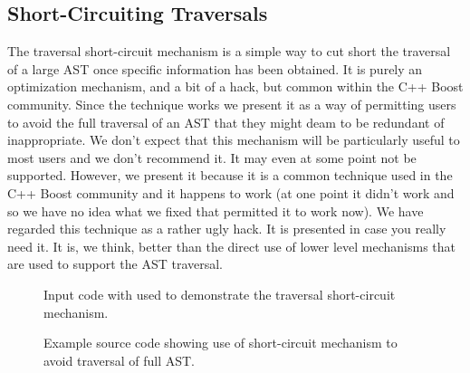 \clearpage
\subsection{Short-Circuiting Traversals}

   The traversal short-circuit mechanism is a simple way to cut short
the traversal of a large AST once specific information has been obtained.
It is purely an optimization mechanism, and a bit of a hack, but common
within the C++ Boost community.  Since the technique works we present it
as a way of permitting users to avoid the full traversal of an AST
that they might deam to be redundant of inappropriate.  We don't
expect that this mechanism will be particularly useful to most users
and we don't recommend it.  It may even at some point not be supported.
However, we present it because it is a common technique used in the C++ 
Boost community and it happens to work (at one point it didn't work and
so we have no idea what we fixed that permitted it to work now).  We have
regarded this technique as a rather ugly hack.  It is presented in case
you really need it.  It is, we think, better than the direct use of lower
level mechanisms that are used to support the AST traversal.

\begin{figure}[!h]
{\indent
{\mySmallFontSize

\begin{latexonly}
   
\end{latexonly}

\begin{htmlonly}
   
\end{htmlonly}
}
}
\caption{Input code with used to demonstrate the traversal short-circuit mechanism.}
\label{Tutorial:exampleInputCode_ExampleLoopNestingInfoProcessing}
\end{figure}

\begin{figure}[!h]
{\indent
{\mySmallFontSize

\begin{latexonly}
   
\end{latexonly}

\begin{htmlonly}
   
\end{htmlonly}

}
}
\caption{Example source code showing use of short-circuit mechanism to avoid traversal of full AST.}
\label{Tutorial:exampleTraversalShortCircuit}
\end{figure}


